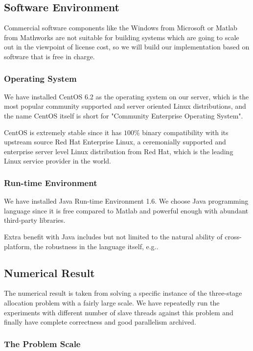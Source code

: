 \subsection{Software Environment}

Commercial software components like the Windows from Microsoft or Matlab from Mathworks are not suitable for building systems which are going to scale out in the viewpoint of license cost, so we will build our implementation based on software that is free in charge.

\subsubsection{Operating System}

We have installed CentOS 6.2 as the operating system on our server, which is the most popular community supported and server oriented Linux distributions, and the name CentOS itself is short for "Community Enterprise Operating System".

CentOS is extremely stable since it has $100\%$ binary compatibility with its upstream source Red Hat Enterprise Linux, a ceremonially supported and enterprise server level Linux distribution from Red Hat, which is the leading Linux service provider in the world. 

\subsubsection{Run-time Environment}

We have installed Java Run-time Environment 1.6. We choose Java programming language since it is free compared to Matlab and powerful enough with abundant third-party libraries.

Extra benefit with Java includes but not limited to the natural ability of cross-platform, the robustness in the language itself, e.g..

\subsection{Numerical Result}

The numerical result is taken from solving a specific instance of the three-stage allocation problem with a fairly large scale. We have repeatedly run the experiments with different number of slave threads against this problem and finally have complete correctness and good parallelism archived.

\subsubsection{The Problem Scale}

